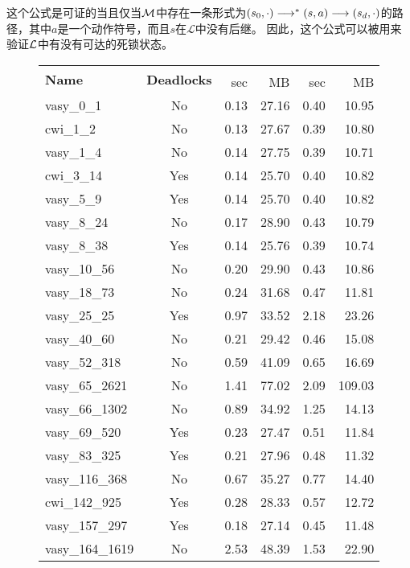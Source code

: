 这个公式是可证的当且仅当$\cal M$中存在一条形式为$(s_0,\cdot)\longrightarrow^*(s,a)\longrightarrow (s_d,\cdot)$的路径，其中$a$是一个动作符号，而且$s$在$\mathcal{L}$中没有后继。
因此，这个公式可以被用来验证$\cal L$中有没有可达的死锁状态。 
\begin{figure}[h!]
	\centering
	\scriptsize
	\begin{tabular}{| l | c | r | r | r | r |}
		\hline
		\multirow{2}{1cm}{\textbf{Name}} & \multirow{2}{1.5cm}{\textbf{Deadlocks}} & \multicolumn{2}{c|}{\sctlprov{}} & \multicolumn{2}{c|}{\CADP{}}\\
		\cline{3-6}
		{}&{} & sec & MB & sec & MB\\
		\hline
		vasy\_0\_1 & No & 0.13 &	27.16 &	0.40 &	10.95\\\hline
		cwi\_1\_2 & No & 0.13 &	27.67 &	0.39 &	10.80\\\hline
		vasy\_1\_4 	& No & 0.14 &	27.75 &	0.39 &	10.71\\\hline
		cwi\_3\_14 	& Yes & 0.14 &	25.70 &	0.40 &	10.82\\\hline
		vasy\_5\_9 	& Yes &	0.14 &	25.70 &	0.40 &	10.82\\\hline
		vasy\_8\_24 & No &	0.17 & 	28.90 &	0.43 &	10.79\\\hline
		vasy\_8\_38 & Yes &	0.14 &	25.76 &	0.39 &	10.74\\\hline
		vasy\_10\_56 &	No & 0.20 &	29.90 &	0.43 &	10.86\\\hline
		vasy\_18\_73 &	No & 0.24 &	31.68 &	0.47 &	11.81\\\hline
		vasy\_25\_25 &	Yes & 0.97 & 33.52 & 2.18 &	23.26\\\hline
		vasy\_40\_60 &	No &	0.21 &	29.42 &	0.46 &	15.08\\\hline
		vasy\_52\_318 &	No &	0.59 &	41.09 &	0.65 &	16.69\\\hline
		vasy\_65\_2621 & No &	1.41 &	77.02 &	2.09 &	109.03\\\hline
		vasy\_66\_1302 & No &	0.89 &	34.92 &	1.25 &  14.13\\\hline
		vasy\_69\_520 &	Yes &	0.23 &	27.47 &	0.51 &	11.84\\\hline
		vasy\_83\_325 &	Yes &	0.21 &	27.96 &	0.48 &	11.32\\\hline
		vasy\_116\_368 & No &	0.67 &	35.27 &	0.77 &	14.40\\\hline
		cwi\_142\_925 & Yes &	0.28 &	28.33 &	0.57 &	12.72\\\hline
		vasy\_157\_297 & Yes &	0.18 &	27.14 &	0.45 &	11.48\\\hline
		vasy\_164\_1619 & No &	2.53 &	48.39 &	1.53 &	22.90\\\hline

\end{tabular}
\end{figure}
